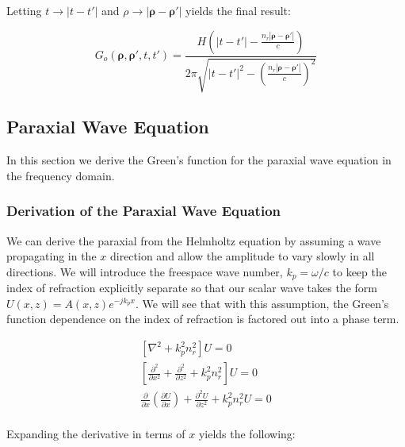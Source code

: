 \noindent Letting $t\rightarrow |t-t'|$ and $\rho \rightarrow |\boldsymbol{\rho} - \boldsymbol{\rho}'|$ yields the final result:

 \begin{equation}
\boxed{G_o\left(\boldsymbol{\rho},\boldsymbol{\rho}',t,t'\right) = \frac{H\left(|t-t'| -\frac{n_r|\boldsymbol{\rho} - \boldsymbol{\rho}'|}{c}\right)}{2\pi \sqrt{|t-t'|^2 -\left(\frac{n_r|\boldsymbol{\rho} - \boldsymbol{\rho}'|}{c}\right)^2 }     }}
\label{gf_eq:40l}
\end{equation}
\renewcommand{\baselinestretch}{2} \small\normalsize

\subsection {Paraxial Wave Equation} \label{gf_sec:paraxial}
In this section we derive the Green's function for the paraxial wave equation in the frequency domain.

\subsubsection {Derivation of the Paraxial Wave Equation}
We can derive the paraxial from the Helmholtz equation by assuming a wave propagating in the $x$ direction and allow the amplitude to vary slowly in all directions. We will introduce the freespace wave number, $k_p = \omega /c$ to keep the index of refraction explicitly separate so that our scalar wave takes the form $U(x,z) = A(x,z)e^{-jk_px}$. We will see that with this assumption, the Green's function dependence on the index of refraction is factored out into a phase term.

 \begin{equation}
 \begin{gathered}
 \left[ \nabla^2 + k_p^2n_r^2\right]U = 0 \\
\left[\frac{\partial^2 }{\partial x^2} + \frac{\partial^2 }{\partial z^2} + k_p^2n_r^2\right]U = 0 \\
\frac{\partial }{\partial x}\left(\frac{\partial U}{\partial x} \right) + \frac{\partial^2 U}{\partial z^2} + k_p^2n_r^2 U = 0 \\
\end{gathered}
\label{gf_eq:41}
\end{equation}
\renewcommand{\baselinestretch}{2} \small\normalsize

\noindent Expanding the derivative in terms of $x$ yields the following:

